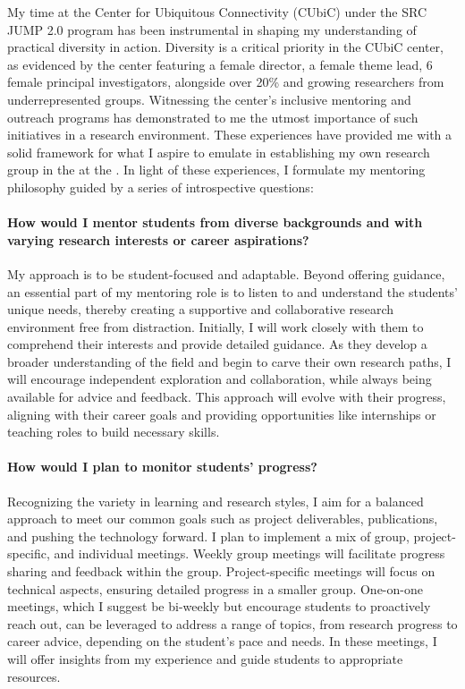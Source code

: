 My time at the Center for Ubiquitous Connectivity (CUbiC) under the SRC JUMP 2.0 program has been instrumental in shaping my understanding of practical diversity in action. Diversity is a critical priority in the CUbiC center, as evidenced by the center featuring a female director, a female theme lead, 6 female principal investigators, alongside over 20\% and growing researchers from underrepresented groups. Witnessing the center's inclusive mentoring and outreach programs has demonstrated to me the utmost importance of such initiatives in a research environment. These experiences have provided me with a solid framework for what I aspire to emulate in establishing my own research group in the \appDept{} at the \appSchool{}. In light of these experiences, I formulate my mentoring philosophy guided by a series of introspective questions:

\paragraph{How would I mentor students from diverse backgrounds and with varying research interests or career aspirations?}
My approach is to be student-focused and adaptable. Beyond offering guidance, an essential part of my mentoring role is to listen to and understand the students' unique needs, thereby creating a supportive and collaborative research environment free from distraction. Initially, I will work closely with them to comprehend their interests and provide detailed guidance. As they develop a broader understanding of the field and begin to carve their own research paths, I will encourage independent exploration and collaboration, while always being available for advice and feedback. This approach will evolve with their progress, aligning with their career goals and providing opportunities like internships or teaching roles to build necessary skills.

\paragraph{How would I plan to monitor students' progress?}
Recognizing the variety in learning and research styles, I aim for a balanced approach to meet our common goals such as project deliverables, publications, and pushing the technology forward. I plan to implement a mix of group, project-specific, and individual meetings. Weekly group meetings will facilitate progress sharing and feedback within the group. Project-specific meetings will focus on technical aspects, ensuring detailed progress in a smaller group. One-on-one meetings, which I suggest be bi-weekly but encourage students to proactively reach out, can be leveraged to address a range of topics, from research progress to career advice, depending on the student's pace and needs. In these meetings, I will offer insights from my experience and guide students to appropriate resources.

